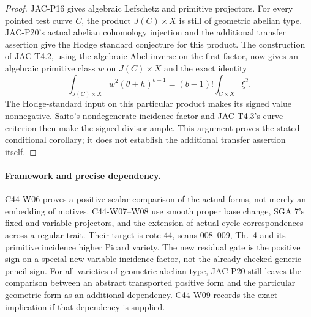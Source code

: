 \begin{proof}
JAC-P16 gives algebraic Lefschetz and primitive projectors. For
every pointed test curve $C$, the product $J(C)\times X$ is still
of geometric abelian type. JAC-P20's actual abelian cohomology
injection and the additional transfer assertion give the Hodge
standard conjecture for this product. The construction of
JAC-T4.2, using the algebraic Abel inverse on the first factor,
now gives an algebraic primitive class $w$ on $J(C)\times X$ and
the exact identity
\[
 \int_{J(C)\times X}w^2(\theta+h)^{b-1}
       =(b-1)!\int_{C\times X}\xi^2.
\]
The Hodge-standard input on this particular product makes its
signed value nonnegative. Saito's nondegenerate incidence factor
and JAC-T4.3's curve criterion then make the signed divisor ample.
This argument proves the stated conditional corollary; it does
not establish the additional transfer assertion itself.
\end{proof}

\paragraph{Framework and precise dependency.}
C44-W06 proves a positive scalar comparison of the actual forms,
not merely an embedding of motives. C44-W07--W08 use smooth
proper base change, SGA 7's fixed and variable projectors, and
the extension of actual cycle correspondences across a regular
trait. Their target is cote 44, scans 008--009, Th.~4 and its
primitive incidence higher Picard variety. The new residual gate
is the positive sign on a special new variable incidence factor,
not the already checked generic pencil sign. For all varieties
of geometric abelian type, JAC-P20 still leaves the comparison
between an abstract transported positive form and the particular
geometric form as an additional dependency. C44-W09 records
the exact implication if that dependency is supplied.

